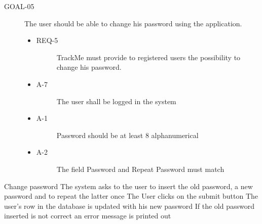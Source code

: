 \documentclass[a4paper]{article}
\newcommand{\requirement}{\ding{229}}%
\begin{document}
               \begin{description}
        	\item[GOAL-05] The user should be able to change his password using the application. 
            	\begin{itemize}
            	    \item[\requirement]
                	\begin{description}
                	\item[REQ-5] TrackMe must provide to registered users the possibility to change his password. 
                	\end{description}
                	\item
                	\begin{description}
                	\item[A-7] The user shall be logged in the system
                	\end{description}
                		\item
                	\begin{description}
                	\item[A-1] Password should be at least 8 alphanumerical
                	\end{description}
                	\item
                	\begin{description}
                	\item[A-2] The field Password and Repeat Password must match
                	\end{description}
                	\end{itemize}
        \end{description}
       
       
       
       \begin{usecase}{Change password}
              {The system asks to the user to insert the old password, a new password and to repeat the latter once}
              {The User clicks on the submit button}
              {The user's row in the database is updated with his new password}
        {If the old password inserted is not correct an error message is printed out}
       \end{usecase}
       
\end{document}
